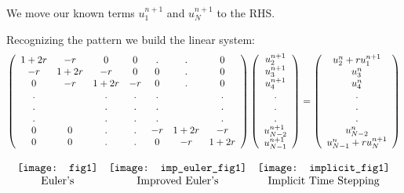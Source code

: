 \documentclass[compress]{beamer}
\begin{document}
\begin{frame}
We move our known terms $u_1^{n+1}$ and $u_N^{n+1}$ to the RHS. 
\vspace{.2in}

Recognizing the pattern we build the linear system:
\begingroup
\fontsize{6pt}{10pt}\selectfont
\[
\left(\begin{array}{c c c c c c c}  1+2r	&-r		&0		&0	&.	&.		&0		\\
										-r		&1+2r	&-r		&0	&0	&.		&0		\\
										0		&-r		&1+2r	&-r	&0	&.		&0		\\
										.		&		&.		&.	&.	&		&.		\\
										.		&		&.		&.	&.	&		&.		\\
										.		&		&.		&.	&.	&		&.		\\
										0		&0		&.		&.	&-r	&1+2r	&-r		\\
										0		&0		&.		&.	&0	&-r		&1+2r	\\ 
\end{array}\right)	
\left(\begin{array}{c} u_2^{n+1}\\u_3^{n+1}\\u_4^{n+1}\\.\\.\\.\\u_{N-2}^{n+1}\\u_{N-1}^{n+1}
\end{array}\right)
=\left(\begin{array}{c} u_2^n+ru_1^{n+1}\\u_3^n\\u_4^n\\.\\.\\.\\u_{N-2}^n\\u_{N-1}^n+ru_N^{n+1}
\end{array}\right)
\]
\endgroup
\end{frame}

\begin{frame}
\[
\begin{array}{c c c}
\texttt{[image: fig1]} 	&	\texttt{[image: imp\_euler\_fig1]}		&	\texttt{[image: implicit\_fig1]}	\\
\text{Euler's} 						&	\text{Improved Euler's}									&	\text{Implicit Time Stepping}  
\end{array}	
\]
\end{frame}
\end{document}
